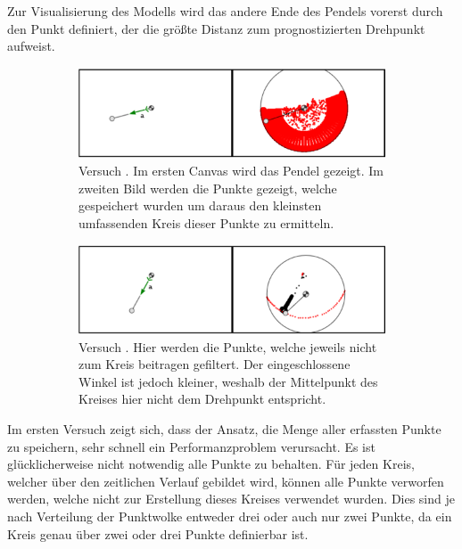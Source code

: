 Zur Visualisierung des Modells wird das andere Ende des Pendels vorerst durch den Punkt definiert, der die grö{\ss}te Distanz zum prognostizierten Drehpunkt aufweist.

\begin{figure}
    \centering
    \begin{subfigure}[t]{0.45\textwidth}
        \includegraphics[width=\textwidth]{gfx/pendel1_1.png}
        \caption{Versuch . Im ersten Canvas wird das Pendel gezeigt. Im zweiten Bild werden die Punkte gezeigt, welche gespeichert wurden um daraus den kleinsten umfassenden Kreis dieser Punkte zu ermitteln.}\label{fig:pendel1_1}
    \end{subfigure}
    \begin{subfigure}[t]{0.45\textwidth}
        \includegraphics[width=\textwidth]{gfx/pendel1_2.png}
        \caption{Versuch . Hier werden die Punkte, welche jeweils nicht zum Kreis beitragen gefiltert. Der eingeschlossene Winkel ist jedoch kleiner, weshalb der Mittelpunkt des Kreises hier nicht dem Drehpunkt entspricht.}\label{fig:pendel1_2}
    \end{subfigure}
    \caption[Versuche  und ]{}
    \label{fig:pendel1_1_2}
\end{figure}

Im ersten Versuch zeigt sich, dass der Ansatz, die Menge aller erfassten Punkte zu speichern, sehr schnell ein Performanzproblem verursacht.
Es ist glücklicherweise nicht notwendig alle Punkte zu behalten.
Für jeden Kreis, welcher über den zeitlichen Verlauf gebildet wird, können alle Punkte verworfen werden, welche nicht zur Erstellung dieses Kreises verwendet wurden.
Dies sind je nach Verteilung der Punktwolke entweder drei oder auch nur zwei Punkte, da ein Kreis genau über zwei oder drei Punkte definierbar ist.

